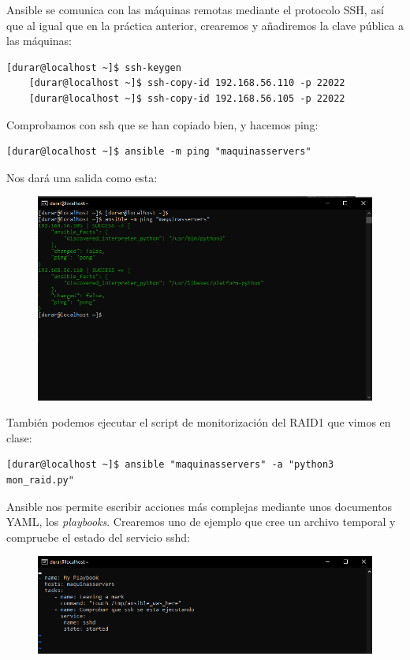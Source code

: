 \documentclass[a4paper]{article}
\begin{document}
Ansible se comunica con las máquinas remotas mediante el protocolo SSH, así que al igual que en la 
práctica anterior, crearemos y añadiremos la clave pública a las máquinas:
\begin{lstlisting}[style=bashCentOS]
    [durar@localhost ~]$ ssh-keygen
    [durar@localhost ~]$ ssh-copy-id 192.168.56.110 -p 22022
    [durar@localhost ~]$ ssh-copy-id 192.168.56.105 -p 22022
\end{lstlisting}
Comprobamos con ssh que se han copiado bien, y hacemos ping:
\begin{lstlisting}[style=bashCentOS]
    [durar@localhost ~]$ ansible -m ping "maquinasservers"
\end{lstlisting}
Nos dará una salida como esta:
\begin{figure}[hbt!]
    \centering
    \includegraphics[width=\textwidth]{salida de ansible ping.png}
\end{figure}
\newline También podemos ejecutar el script de monitorización del RAID1 que vimos en clase:
\begin{lstlisting}[style=bashCentOS]
    [durar@localhost ~]$ ansible "maquinasservers" -a "python3 mon_raid.py"
\end{lstlisting}
Ansible nos permite escribir acciones más complejas mediante unos documentos YAML, los \textsl{playbooks}.
Crearemos uno de ejemplo que cree un archivo temporal y compruebe el estado del servicio sshd:
\begin{figure}[hbt!]
    \centering
    \includegraphics[width=\textwidth]{mi playbook.png}
\end{figure}
\end{document}
